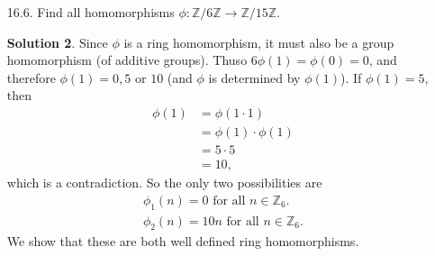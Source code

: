 \documentclass{article}
\newcommand{\ZZ}{\mathbb{Z}}
\theoremstyle{definition}
\newtheorem*{solution}{Solution}
\begin{document}
\begin{enumerate}
\begin{solution}
Let $S$ be the subring of matrices of the form $\begin{psmallmatrix} a & 0 \\ 0 & 0 \end{psmallmatrix}$.  Then $\begin{psmallmatrix} 1 & 0 \\ 0 & 0 \end{psmallmatrix}$ is an identity for $S$, since
\begin{align*}
\begin{pmatrix} 1 & 0 \\ 0 & 0 \end{pmatrix} \begin{pmatrix} a & 0 \\ 0 & 0 \end{pmatrix} &= \begin{pmatrix} a & 0 \\ 0 & 0 \end{pmatrix}, \\
\begin{pmatrix} a & 0 \\ 0 & 0 \end{pmatrix} \begin{pmatrix} 1 & 0 \\ 0 & 0 \end{pmatrix} &= \begin{pmatrix} a & 0 \\ 0 & 0 \end{pmatrix}.
\end{align*}
\end{solution}
\item[16.6.] Find all homomorphisms $\phi : \ZZ/6\ZZ \to \ZZ/15\ZZ$.
\begin{solution}
Since $\phi$ is a ring homomorphism, it must also be a group homomorphism (of additive groups).  Thuso $6\phi(1) = \phi(0) = 0$, and therefore $\phi(1) = 0, 5$ or $10$ (and $\phi$ is determined by $\phi(1)$).  If $\phi(1) = 5$, then
\begin{align*}
\phi(1) &= \phi(1 \cdot 1) \\
&= \phi(1) \cdot \phi(1) \\
&= 5 \cdot 5 \\
&= 10,
\end{align*}
which is a contradiction.  So the only two possibilities are
\begin{align*}
\phi_1(n) = 0 \mbox{ for all $n \in \ZZ_6$.}\\
\phi_2(n) = 10n \mbox{ for all $n \in \ZZ_6$.}
\end{align*}
We show that these are both well defined ring homomorphisms.


\end{solution}
\end{enumerate}
\end{document}
